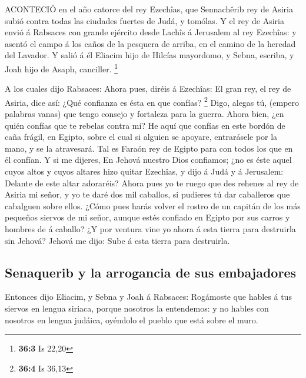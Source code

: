  ACONTECIÓ en el año catorce del rey Ezechîas, que
Sennachêrib rey de Asiria subió contra todas las ciudades fuertes de
Judá, y tomólas.  Y el rey de Asiria envió á Rabsaces con
grande ejército desde Lachîs á Jerusalem al rey Ezechîas: y asentó el
campo á los caños de la pesquera de arriba, en el camino de la heredad
del Lavador.  Y salió á él Eliacim hijo de Hilcías
mayordomo, y Sebna, escriba, y Joah hijo de Asaph, canciller.
\footnote{\textbf{36:3} Is 22,20}

 A los cuales dijo Rabsaces: Ahora pues, diréis á Ezechîas:
El gran rey, el rey de Asiria, dice así: ¿Qué confianza es ésta en que
confías? \footnote{\textbf{36:4} Is 36,13}  Digo, alegas tú,
(empero palabras vanas) que tengo consejo y fortaleza para la guerra.
Ahora bien, ¿en quién confías que te rebelas contra mí?  He
aquí que confías en este bordón de caña frágil, en Egipto, sobre el cual
si alguien se apoyare, entrarásele por la mano, y se la atravesará. Tal
es Faraón rey de Egipto para con todos los que en él confían.
 Y si me dijeres, En Jehová nuestro Dios confiamos; ¿no es
éste aquel cuyos altos y cuyos altares hizo quitar Ezechîas, y dijo á
Judá y á Jerusalem: Delante de este altar adoraréis?  Ahora
pues yo te ruego que des rehenes al rey de Asiria mi señor, y yo te daré
dos mil caballos, si pudieres tú dar caballeros que cabalguen sobre
ellos.  ¿Cómo pues harás volver el rostro de un capitán de
los más pequeños siervos de mi señor, aunque estés confiado en Egipto
por sus carros y hombres de á caballo?  ¿Y por ventura vine
yo ahora á esta tierra para destruirla sin Jehová? Jehová me dijo: Sube
á esta tierra para destruirla.

\hypertarget{senaquerib-y-la-arrogancia-de-sus-embajadores}{%
\subsection{Senaquerib y la arrogancia de sus
embajadores}\label{senaquerib-y-la-arrogancia-de-sus-embajadores}}

 Entonces dijo Eliacim, y Sebna y Joah á Rabsaces:
Rogámoste que hables á tus siervos en lengua siriaca, porque nosotros la
entendemos: y no hables con nosotros en lengua judáica, oyéndolo el
pueblo que está sobre el muro.

